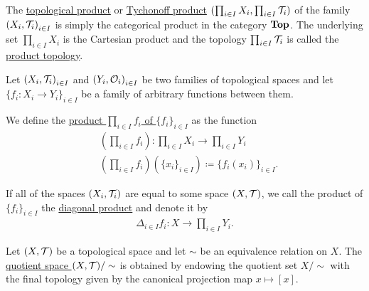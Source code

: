 \begin{definition}\label{def:topological_product}
  The \uline{topological product} or \uline{Tychonoff product} $(\prod_{i \in I} X_i, \prod_{i \in I} \mathcal T_i)$ of the family ${ (X_i, \mathcal T_i) }_{i \in I}$ is simply the categorical product in the category $\operatorname{\mathbf{Top}}$. The underlying set $\prod_{i \in I} X_i$ is the Cartesian product and the topology $\prod_{i \in I} \mathcal T_i$ is called the \uline{product topology}.

  Let ${ (X_i, \mathcal T_i) }_{i \in I}$ and ${ (Y_i, \mathcal O_i) }_{i \in I}$ be two families of topological spaces and let $\{ f_i: X_i \to Y_i \}_{i \in I}$ be a family of arbitrary functions between them.

  We define the \uline{product $\prod_{i \in I} f_i$ of $\{ f_i \}_{i \in I}$} as the function
  \begin{align*}
    &\left(\prod_{i \in I} f_i \right): \prod_{i \in I} X_i \to \prod_{i \in I} Y_i \\
    &\left(\prod_{i \in I} f_i \right)(\{ x_i \}_{i \in I}) \coloneqq \{ f_i (x_i) \}_{i \in I}.
  \end{align*}

  If all of the spaces $(X_i, \mathcal T_i)$ are equal to some space $(X, \mathcal T)$, we call the product of $\{ f_i \}_{i \in I}$ the \uline{diagonal product} and denote it by
  \begin{align*}
    \Delta_{i \in I} f_i: X \to \prod_{i \in I} Y_i.
  \end{align*}
\end{definition}

\begin{definition}\label{def:topological_quotient}\cite[39]{Lectures:general_topology}
  Let $(X, \mathcal T)$ be a topological space and let $\sim$ be an equivalence relation on $X$. The \uline{quotient space $(X, \mathcal T) / \sim$} is obtained by endowing the quotient set $X / \sim$ with the final topology given by the canonical projection map $x \mapsto [x]$.
\end{definition}


